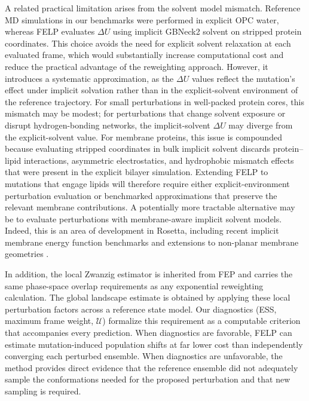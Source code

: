 \documentclass[journal=jctcce,manuscript=article,layout=twocolumn,hyperref=true]{achemso}
\begin{document}
	A related practical limitation arises from the solvent model mismatch. Reference MD simulations in our benchmarks were performed in explicit OPC water, whereas FELP evaluates $\Delta U$ using implicit GBNeck2 solvent on stripped protein coordinates. This choice avoids the need for explicit solvent relaxation at each evaluated frame, which would substantially increase computational cost and reduce the practical advantage of the reweighting approach. However, it introduces a systematic approximation, as the $\Delta U$ values reflect the mutation's effect under implicit solvation rather than in the explicit-solvent environment of the reference trajectory. For small perturbations in well-packed protein cores, this mismatch may be modest; for perturbations that change solvent exposure or disrupt hydrogen-bonding networks, the implicit-solvent $\Delta U$ may diverge from the explicit-solvent value. For membrane proteins, this issue is compounded because evaluating stripped coordinates in bulk implicit solvent discards protein--lipid interactions, asymmetric electrostatics, and hydrophobic mismatch effects that were present in the explicit bilayer simulation. Extending FELP to mutations that engage lipids will therefore require either explicit-environment perturbation evaluation or benchmarked approximations that preserve the relevant membrane contributions. A potentially more tractable alternative may be to evaluate perturbations with membrane-aware implicit solvent models. Indeed, this is an area of development in Rosetta, including recent implicit membrane energy function benchmarks and extensions to non-planar membrane geometries \cite{alford2021membrane,samanta2024membrane,woods2024membrane}.
	
	In addition, the local Zwanzig estimator is inherited from FEP and carries the same phase-space overlap requirements as any exponential reweighting calculation. The global landscape estimate is obtained by applying these local perturbation factors across a reference state model. Our diagnostics (ESS, maximum frame weight, $\mathcal{U}$) formalize this requirement as a computable criterion that accompanies every prediction. When diagnostics are favorable, FELP can estimate mutation-induced population shifts at far lower cost than independently converging each perturbed ensemble. When diagnostics are unfavorable, the method provides direct evidence that the reference ensemble did not adequately sample the conformations needed for the proposed perturbation and that new sampling is required.
\end{document}
